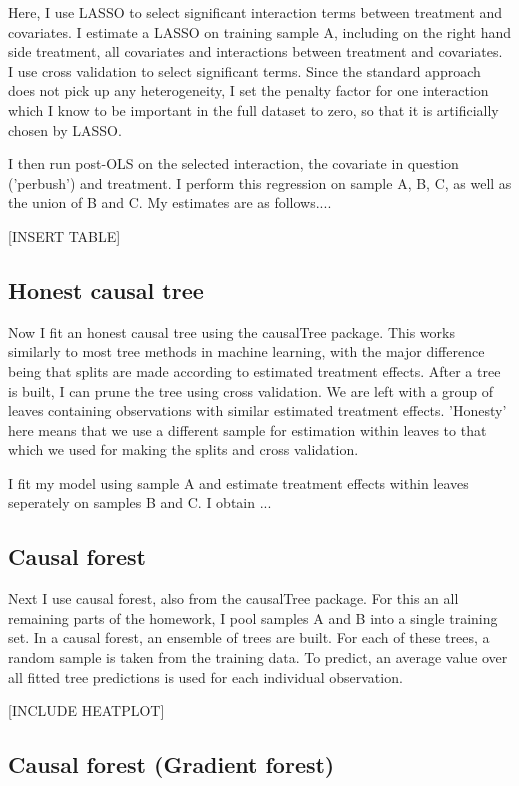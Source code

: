 \documentclass[paper=letter, fontsize=11pt]{scrartcl} %
\begin{document}
Here, I use LASSO to select significant interaction terms between treatment and covariates. I estimate a LASSO on training sample A, including on the right hand side treatment, all covariates and interactions between treatment and covariates. I use cross validation to select significant terms. Since the standard approach does not pick up any heterogeneity, I set the penalty factor for one interaction which I know to be important in the full dataset to zero, so that it is artificially chosen by LASSO.

I then run post-OLS on the selected interaction, the covariate in question ('perbush') and treatment. I perform this regression on sample A, B, C, as well as the union of B and C. My estimates are as follows....

[INSERT TABLE]



\subsection{Honest causal tree}

Now I fit an honest causal tree using the causalTree package. This works similarly to most tree methods in machine learning, with the major difference being that splits are made according to estimated treatment effects. After a tree is built, I can prune the tree using cross validation. We are left with a group of leaves containing observations with similar estimated treatment effects. 'Honesty' here means that we use a different sample for estimation within leaves to that which we used for making the splits and cross validation.

I fit my model using sample A and estimate treatment effects within leaves seperately on samples B and C. I obtain ...

\subsection{Causal forest}

Next I use causal forest, also from the causalTree package. For this an all remaining parts of the homework, I pool samples A and B into a single training set. In a causal forest, an ensemble of trees are built. For each of these trees, a random sample is taken from the training data. To predict, an average value over all fitted tree predictions is used for each individual observation.

[INCLUDE HEATPLOT]

\subsection{Causal forest (Gradient forest)}
\end{document}
